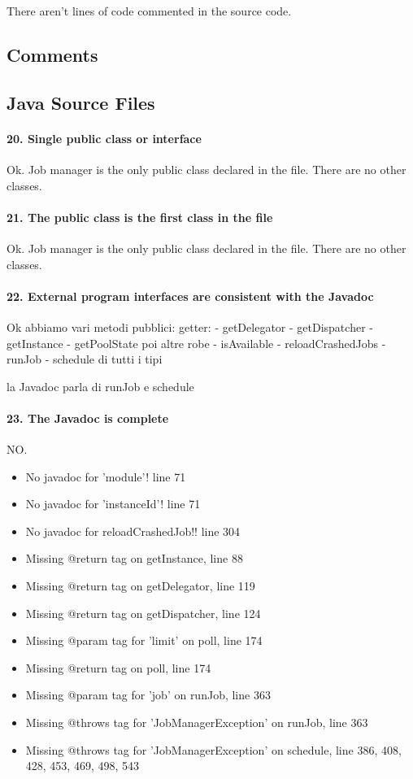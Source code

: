 \documentclass[english]{article}
\begin{document}
There aren't lines of code commented in the source code.\subsection{Comments}

\subsection{Java Source Files}
\paragraph{20. Single public class or interface}
Ok.
Job manager is the only public class declared in the file.
There are no other classes.

\paragraph{21. The public class is the first class in the file}
Ok.
Job manager is the only public class declared in the file.
There are no other classes.

\paragraph{22. External program interfaces are consistent with the Javadoc}
Ok
abbiamo vari metodi pubblici:
getter:
- getDelegator
- getDispatcher
- getInstance
- getPoolState
poi altre robe
- isAvailable
- reloadCrashedJobs
- runJob
- schedule di tutti i tipi

la Javadoc parla di runJob e schedule

\paragraph{23. The Javadoc is complete}
NO.
\begin{itemize}
	\item No javadoc for 'module'! line 71
	\item No javadoc for 'instanceId'! line 71
	\item No javadoc for reloadCrashedJob!! line 304
	\item Missing @return tag on getInstance, line 88
	\item Missing @return tag on getDelegator, line 119
	\item Missing @return tag on getDispatcher, line 124
	\item Missing @param tag for 'limit' on poll, line 174
	\item Missing @return tag on poll, line 174
	\item Missing @param tag for 'job' on runJob, line 363
	\item Missing @throws tag for 'JobManagerException' on runJob, line 363
	\item Missing @throws tag for 'JobManagerException' on schedule, line 386, 408, 428, 453, 469, 498, 543
\end{itemize}
\end{document}
